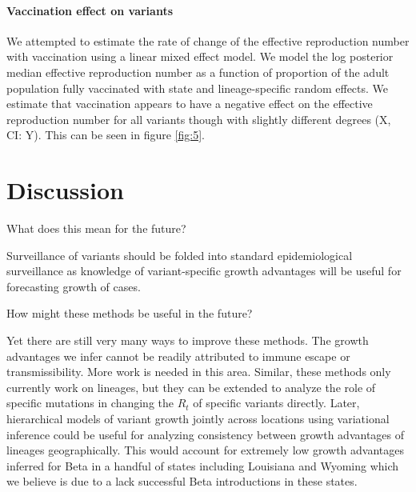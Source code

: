 \documentclass[12pt]{article}
\begin{document}



\paragraph{Vaccination effect on variants}

We attempted to estimate the rate of change of the effective reproduction number with vaccination using a linear mixed effect model. We model the log posterior median effective reproduction number as a function of proportion of the adult population fully vaccinated with state and lineage-specific random effects. We estimate that vaccination appears to have a negative effect on the effective reproduction number for all variants though with slightly different degrees (X, CI: Y). This can be seen in figure \ref{fig:5}.


\section{Discussion}%


What does this mean for the future?

Surveillance of variants should be folded into standard epidemiological surveillance as knowledge of variant-specific growth advantages will be useful for forecasting growth of cases.

How might these methods be useful in the future?

Yet there are still very many ways to improve these methods.
The growth advantages we infer cannot be readily attributed to immune escape or transmissibility. More work is needed in this area. 
Similar, these methods only currently work on lineages, but they can be extended to analyze the role of specific mutations in changing the $R_{t}$ of specific variants directly.
Later, hierarchical models of variant growth jointly across locations using variational inference could be useful for analyzing consistency between growth advantages of lineages geographically.
This would account for extremely low growth advantages inferred for Beta in a handful of states including Louisiana and Wyoming which we believe is due to a lack successful Beta introductions in these states.
\end{document}
